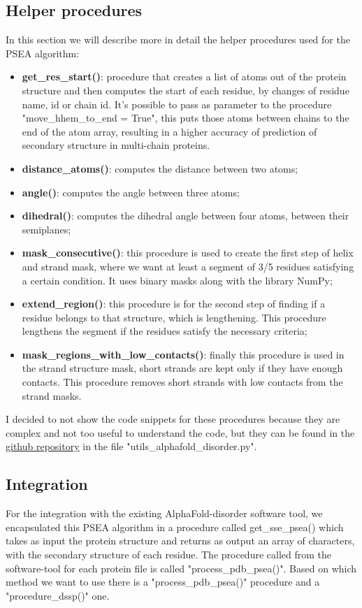 \subsection{Helper procedures} \label{subsect:helper-procedures}
In this section we will describe more in detail the helper procedures used for the PSEA algorithm:
\begin{itemize}
    \item \textbf{get\_res\_start()}: procedure that creates a list of atoms out of the protein structure and then computes the start of each residue, by changes of residue name, id or chain id. It's possible to pass as parameter to the procedure "move\_hhem\_to\_end = True", this puts those atoms between chains to the end of the atom array, resulting in a higher accuracy of prediction of secondary structure in multi-chain proteins.
    \item \textbf{distance\_atoms()}: computes the distance between two atoms;
    \item \textbf{angle()}: computes the angle between three atoms;
    \item \textbf{dihedral()}: computes the dihedral angle between four atoms, between their semiplanes;
    \item \textbf{mask\_consecutive()}: this procedure is used to create the first step of helix and strand mask, where we want at least a segment of 3/5 residues satisfying a certain condition. It uses binary masks along with the library NumPy;
    \item \textbf{extend\_region()}: this procedure is for the second step of finding if a residue belongs to that structure, which is lengthening. This procedure lengthens the segment if the residues satisfy the necessary criteria;
    \item \textbf{mask\_regions\_with\_low\_contacts()}: finally this procedure is used in the strand structure mask, short strands are kept only if they have enough contacts. This procedure removes short strands with low contacts from the strand masks.
\end{itemize}

I decided to not show the code snippets for these procedures because they are complex and not too useful to understand the code, but they can be found in the \href{https://github.com/EvilCrive/AlphaFold-disorder/tree/MobiDB-Alphafold}{\underline{github repository}} in the file "utils\_alphafold\_disorder.py".

\subsection{Integration}
For the integration with the existing AlphaFold-disorder software tool, we encapsulated this PSEA algorithm in a procedure called get\_sse\_psea() which takes as input the protein structure and returns as output an array of characters, with the secondary structure of each residue.
The procedure called from the software-tool for each protein file is called "process\_pdb\_psea()". Based on which method we want to use there is a "process\_pdb\_psea()" procedure and a "procedure\_dssp()" one.

